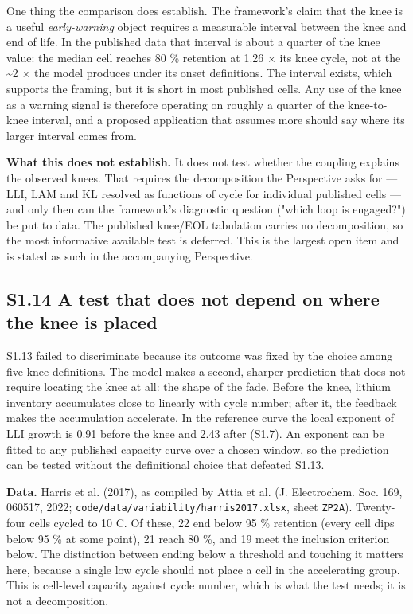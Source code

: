 \documentclass[11pt,a4paper]{article}
\begin{document}
One thing the comparison does establish. The framework's claim that the knee is a useful \emph{early-warning} object requires a measurable interval between the knee and end of life. In the published data that interval is about a quarter of the knee value: the median cell reaches 80 \% retention at 1.26 \ensuremath{\times} its knee cycle, not at the \textasciitilde{}2 \ensuremath{\times} the model produces under its onset definitions. The interval exists, which supports the framing, but it is short in most published cells. Any use of the knee as a warning signal is therefore operating on roughly a quarter of the knee-to-knee interval, and a proposed application that assumes more should say where its larger interval comes from.


\textbf{What this does not establish.} It does not test whether the coupling explains the observed knees. That requires the decomposition the Perspective asks for --- LLI, LAM and KL resolved as functions of cycle for individual published cells --- and only then can the framework's diagnostic question ("which loop is engaged?") be put to data. The published knee/EOL tabulation carries no decomposition, so the most informative available test is deferred. This is the largest open item and is stated as such in the accompanying Perspective.


\subsection*{S1.14 A test that does not depend on where the knee is placed}


S1.13 failed to discriminate because its outcome was fixed by the choice among five knee definitions. The model makes a second, sharper prediction that does not require locating the knee at all: the shape of the fade. Before the knee, lithium inventory accumulates close to linearly with cycle number; after it, the feedback makes the accumulation accelerate. In the reference curve the local exponent of LLI growth is 0.91 before the knee and 2.43 after (S1.7). An exponent can be fitted to any published capacity curve over a chosen window, so the prediction can be tested without the definitional choice that defeated S1.13.


\textbf{Data.} Harris et al. (2017), as compiled by Attia et al. (J. Electrochem. Soc. 169, 060517, 2022; \texttt{code/data/}\hspace{0pt}\texttt{variability/}\hspace{0pt}\texttt{harris2017.}\hspace{0pt}\texttt{xlsx}, sheet \texttt{ZP2A}). Twenty-four cells cycled to 10 C. Of these, 22 end below 95 \% retention (every cell dips below 95 \% at some point), 21 reach 80 \%, and 19 meet the inclusion criterion below. The distinction between ending below a threshold and touching it matters here, because a single low cycle should not place a cell in the accelerating group. This is cell-level capacity against cycle number, which is what the test needs; it is not a decomposition.
\end{document}
